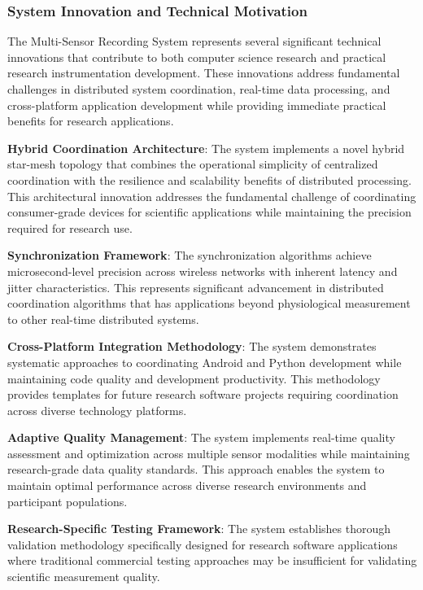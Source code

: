 \documentclass[11pt,a4paper]{article}
\begin{document}
\subsubsection{System Innovation and Technical Motivation}

The Multi-Sensor Recording System represents several significant technical
innovations that contribute to both computer
science research and practical research instrumentation development.  These
innovations address fundamental challenges in
distributed system coordination, real-time data processing, and cross-platform
application development while providing
immediate practical benefits for research applications.

\textbf{Hybrid Coordination Architecture}: The system implements a novel hybrid star-mesh topology that combines the
operational simplicity of centralized coordination with the resilience and
scalability benefits of distributed
processing.  This architectural innovation addresses the fundamental challenge of
coordinating consumer-grade devices for
scientific applications while maintaining the precision required for research use.

\textbf{Synchronization Framework}: The synchronization algorithms achieve microsecond-level precision across
wireless networks with inherent latency and jitter characteristics.  This represents
significant advancement in
distributed coordination algorithms that has applications beyond physiological
measurement to other real-time
distributed systems.

\textbf{Cross-Platform Integration Methodology}: The system demonstrates systematic approaches to coordinating Android and
Python development while maintaining code quality and development productivity.  This
methodology provides templates for
future research software projects requiring coordination across diverse technology
platforms.

\textbf{Adaptive Quality Management}: The system implements real-time quality assessment and optimization across multiple
sensor modalities while maintaining research-grade data quality standards.  This
approach enables the system to maintain
optimal performance across diverse research environments and participant populations.

\textbf{Research-Specific Testing Framework}: The system establishes thorough validation methodology specifically
designed for research software applications where traditional commercial testing
approaches may be insufficient for
validating scientific measurement quality.
\end{document}
